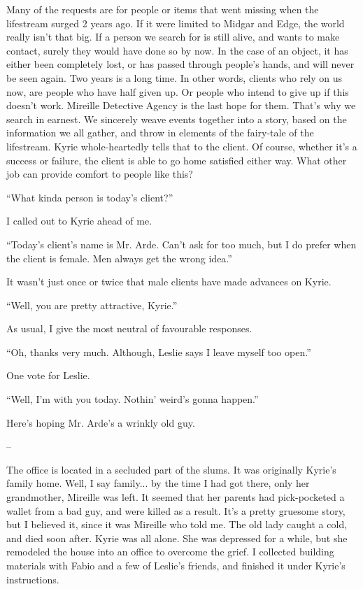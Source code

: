 \documentclass[oneside]{book}
\begin{document}
Many of the requests are for people or items that went missing when the lifestream surged 2 years ago. If it were limited to Midgar and Edge, the world really isn’t that big. If a person we search for is still alive, and wants to make contact, surely they would have done so by now. In the case of an object, it has either been completely lost, or has passed through people’s hands, and will never be seen again. Two years is a long time. In other words, clients who rely on us now, are people who have half given up. Or people who intend to give up if this doesn’t work. Mireille Detective Agency is the last hope for them. That’s why we search in earnest. We sincerely weave events together into a story, based on the information we all gather, and throw in elements of the fairy-tale of the lifestream. Kyrie whole-heartedly tells that to the client. Of course, whether it’s a success or failure, the client is able to go home satisfied either way. What other job can provide comfort to people like this?

“What kinda person is today’s client?”

I called out to Kyrie ahead of me.

“Today’s client’s name is Mr. Arde. Can’t ask for too much, but I do prefer when the client is female. Men always get the wrong idea.”

It wasn’t just once or twice that male clients have made advances on Kyrie.

“Well, you are pretty attractive, Kyrie.”

As usual, I give the most neutral of favourable responses.

“Oh, thanks very much. Although, Leslie says I leave myself too open.”

One vote for Leslie.

“Well, I’m with you today. Nothin’ weird’s gonna happen.”

Here’s hoping Mr. Arde’s a wrinkly old guy.

–

The office is located in a secluded part of the slums. It was originally Kyrie’s family home. Well, I say family... by the time I had got there, only her grandmother, Mireille was left. It seemed that her parents had pick-pocketed a wallet from a bad guy, and were killed as a result. It’s a pretty gruesome story, but I believed it, since it was Mireille who told me. The old lady caught a cold, and died soon after. Kyrie was all alone. She was depressed for a while, but she remodeled the house into an office to overcome the grief. I collected building materials with Fabio and a few of Leslie’s friends, and finished it under Kyrie’s instructions.
\end{document}

